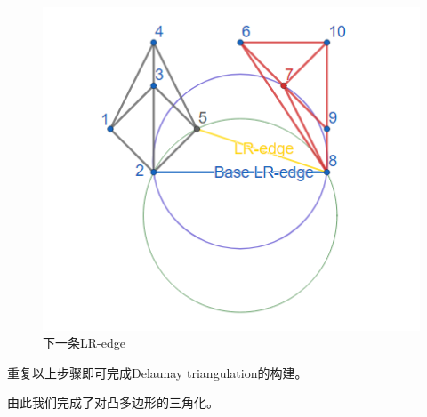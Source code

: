 \begin{figure}[htbp]
\begin{minipage}{0.32\textwidth}
        \includegraphics[width=\textwidth]
        {figures/DT8.png}
        \caption{下一条LR-edge}
    \end{minipage}
\end{figure}



重复以上步骤即可完成Delaunay triangulation的构建。

由此我们完成了对凸多边形的三角化。



